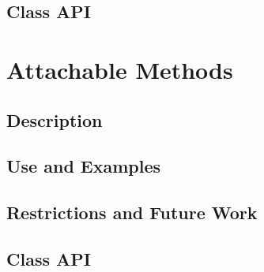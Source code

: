 \documentclass[english]{article}
\begin{document}
\subsection{Class API}






%
%
%
\section{Attachable Methods}
\subsection{Description}

\subsection{Use and Examples}


\subsection{Restrictions and Future Work}

\subsection{Class API}

%
\end{document}
